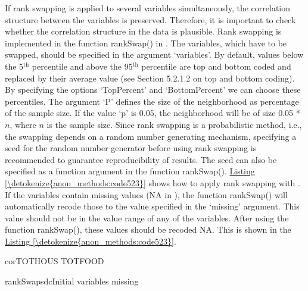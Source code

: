 \documentclass[letterpaper,10pt,english]{sphinxmanual}
\begin{document}
If rank swapping is applied to several variables simultaneously, the
correlation structure between the variables is preserved. Therefore, it
is important to check whether the correlation structure in the data is
plausible. Rank swapping is implemented in the function rankSwap() in
. The variables, which have to be swapped, should be specified
in the argument ‘variables’. By default, values below the 5$^{\text{th}}$
percentile and above the 95$^{\text{th}}$ percentile are top and bottom
coded and replaced by their average value (see Section 5.2.1.2 on top
and bottom coding). By specifying the options ‘TopPercent’ and
‘BottomPercent’ we can choose these percentiles. The argument ‘P’
defines the size of the neighborhood as percentage of the sample size.
If the value ‘p’ is 0.05, the neighborhood will be of size 0.05 *
\(n\), where \(n\) is the sample size. Since rank swapping is a
probabilistic method, i.e., the swapping depends on a random number
generating mechanism, specifying a seed for the random number generator
before using rank swapping is recommended to guarantee reproducibility
of results. The seed can also be specified as a function argument in the
function rankSwap(). \hyperref[\detokenize{anon_methods:code523}]{Listing \ref{\detokenize{anon_methods:code523}}} shows how to apply rank swapping with
. If the variables contain missing values (NA in ), the
function rankSwap() will automatically recode those to the value
specified in the ‘missing’ argument. This value should not be in the
value range of any of the variables. After using the function
rankSwap(), these values should be recoded NA. This is shown in the
\hyperref[\detokenize{anon_methods:code523}]{Listing \ref{\detokenize{anon_methods:code523}}}.

\def\sphinxLiteralBlockLabel{\label{\detokenize{anon_methods:code523}}}
%
\begin{sphinxVerbatim}[commandchars=\\\{\},numbers=left,firstnumber=1,stepnumber=1]
 corTOTHOUS TOTFOOD


 rankSwapsdcInitial variables    missing  
\end{sphinxVerbatim}
\end{document}
